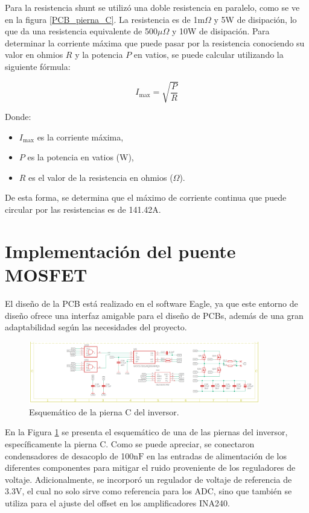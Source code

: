 \documentclass[11pt]{report}
\begin{document}
Para la resistencia shunt se utilizó una doble resistencia en paralelo, como se ve en la figura \ref{PCB_pierna_C}. La resistencia es de 1m$\Omega$ y 5W de disipación, lo que da una resistencia equivalente de 500$\mu\Omega$ y 10W de disipación. Para determinar la corriente máxima que puede pasar por la resistencia conociendo su valor en ohmios \( R \) y la potencia \( P \) en vatios, se puede calcular utilizando la siguiente fórmula:

\[
	I_{\text{max}} = \sqrt{\frac{P}{R}}
\]

Donde:
\begin{itemize}
	\item \( I_{\text{max}} \) es la corriente máxima,
	\item \( P \) es la potencia en vatios (W),
	\item \( R \) es el valor de la resistencia en ohmios ($\Omega$).
\end{itemize}

De esta forma, se determina que el máximo de corriente continua que puede circular por las resistencias es de 141.42A.

\newpage
\section{Implementación del puente MOSFET}
El diseño de la PCB está realizado en el software Eagle, ya que este entorno de diseño ofrece una interfaz amigable para el diseño de PCBs, además de una gran adaptabilidad según las necesidades del proyecto.

\begin{figure}[ht]
	\centering
	\includegraphics[width=0.9\textwidth]{imagenes/Diagramas/esquematico_pierna_C.png}
	\caption{Esquemático de la pierna C del inversor.}
	\label{esquema_pierna_C}
\end{figure}
\FloatBarrier

En la Figura \ref{esquema_pierna_C} se presenta el esquemático de una de las piernas del inversor, específicamente la pierna C.  Como se puede apreciar, se conectaron condensadores de desacoplo de 100$\text{nF}$ en las entradas de alimentación de los diferentes componentes para mitigar el ruido proveniente de los reguladores de voltaje. Adicionalmente, se incorporó un regulador de voltaje de referencia de 3.3V, el cual no solo sirve como referencia para los ADC, sino que también se utiliza para el ajuste del offset en los amplificadores INA240.
\end{document}
